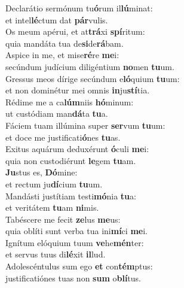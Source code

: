 \evenverse Declarátio sermónum tu\textbf{ó}rum il\textbf{lú}minat:~\*\\
\evenverse et intel\textbf{lé}ctum dat \textbf{pár}vulis.\\
\oddverse Os meum apérui, et at\textbf{trá}xi \textbf{spí}ritum:~\*\\
\oddverse quia mandáta tua de\textbf{si}de\textbf{rá}bam.\\
\evenverse Aspice in me, et mise\textbf{ré}re \textbf{me}i:~\*\\
\evenverse secúndum judícium diligéntium \textbf{no}men \textbf{tu}um.\\
\oddverse Gressus meos dírige secúndum e\textbf{ló}quium \textbf{tu}um:~\*\\
\oddverse et non dominétur mei omnis \textbf{in}ju\textbf{stí}tia.\\
\evenverse Rédime me a ca\textbf{lúm}niis \textbf{hó}minum:~\*\\
\evenverse ut custódiam man\textbf{dá}ta \textbf{tu}a.\\
\oddverse Fáciem tuam illúmina super \textbf{ser}vum \textbf{tu}um:~\*\\
\oddverse et doce me justificati\textbf{ó}nes \textbf{tu}as.\\
\evenverse Exitus aquárum deduxérunt \textbf{ó}culi \textbf{me}i:~\*\\
\evenverse quia non custodiérunt \textbf{le}gem \textbf{tu}am.\\
\oddverse \textbf{Ju}stus es, \textbf{Dó}mine:~\*\\
\oddverse et rectum ju\textbf{dí}cium \textbf{tu}um.\\
\evenverse Mandásti justítiam testi\textbf{mó}nia \textbf{tu}a:~\*\\
\evenverse et veritátem \textbf{tu}am \textbf{ni}mis.\\
\oddverse Tabéscere me fecit \textbf{ze}lus \textbf{me}us:~\*\\
\oddverse quia oblíti sunt verba tua ini\textbf{mí}ci \textbf{me}i.\\
\evenverse Ignítum elóquium tuum \textbf{ve}he\textbf{mén}ter:~\*\\
\evenverse et servus tuus di\textbf{lé}xit \textbf{il}lud.\\
\oddverse Adolescéntulus sum ego \textbf{et} con\textbf{tém}ptus:~\*\\
\oddverse justificatiónes tuas non \textbf{sum} o\textbf{blí}tus.\\
